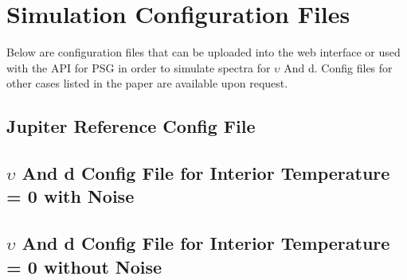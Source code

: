 \documentclass[12pt, letterpaper]{aastex631}
\newcommand\aastex{AAS\TeX}
\begin{document}
\section{Simulation Configuration Files} \label{sec:configfiles}

Below are configuration files that can be uploaded into the web interface or used with the API for PSG in order to simulate spectra for $\upsilon$ And d. Config files for other cases listed in the paper are available upon request.
\newpage

\subsection{Jupiter Reference Config File}
\newpage

\newpage
\subsection{$\upsilon$ And d Config File for Interior Temperature = 0 with Noise}
\newpage

\newpage
\subsection{$\upsilon$ And d Config File for Interior Temperature = 0 without Noise}
\newpage

\newpage


\end{document}
